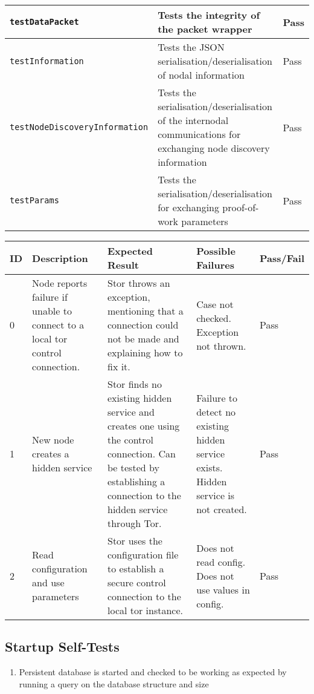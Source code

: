 \begin{landscape}
\begin{table}[h]
\begin{tabular}{| l | p{13cm} | l |}
			\texttt{testDataPacket} & Tests the integrity of the packet wrapper & Pass \\ \hline
			\texttt{testInformation} & Tests the JSON serialisation/deserialisation of nodal information & Pass \\ \hline
			\texttt{testNodeDiscoveryInformation} & Tests the serialisation/deserialisation of the internodal communications for exchanging node discovery information & Pass \\ \hline
			\texttt{testParams} & Tests the serialisation/deserialisation for exchanging proof-of-work parameters & Pass \\ \hline
		\end{tabular}
	\end{table}
	
	\begin{table}[h]
		\begin{tabular}{| l | p{7cm} | p{7cm} | p{4cm} | l |}
			\hline
			ID & Description & Expected Result & Possible Failures & Pass/Fail \\ \hline
			
			0 & Node reports failure if unable to connect to a local tor control connection. & Stor throws an exception, mentioning that a connection could not be made and explaining how to fix it. & Case not checked. \newline Exception not thrown. & Pass \\ \hline
			
			1 & New node creates a hidden service & Stor finds no existing hidden service and creates one using the control connection. Can be tested by establishing a connection to the hidden service through Tor. & Failure to detect no existing hidden service exists. \newline Hidden service is not created. & Pass \\ \hline
			
			2 & Read configuration and use parameters & Stor uses the configuration file to establish a secure control connection to the local tor instance. & Does not read config. \newline Does not use values in config. & Pass \\ \hline
		\end{tabular}
	\end{table}
\end{landscape}

\subsection*{Startup Self-Tests}
\begin{enumerate}
	\item Persistent database is started and checked to be working as expected by running a query on the database structure and size
\end{enumerate}